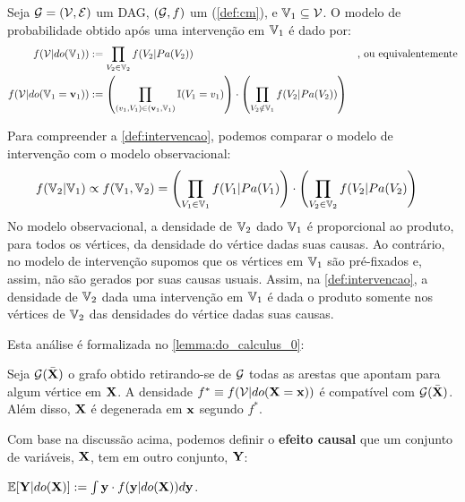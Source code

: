 \begin{definition}
 \label{def:intervencao}
 Seja ${\mathcal G} = ({\mathcal V}, {\mathcal E})$ um DAG,
 $({\mathcal G},f)$ um \CM (\cref{def:cm}), e
 ${\mathbb V}_1 \subseteq {\mathcal V}$. 
 O modelo de probabilidade obtido após
 uma intervenção em ${\mathbb V}_1$ é dado por:
 \begin{align*}
  f({\mathcal V}|do({\mathbb V}_1))
  &:= \prod_{V_2 \in {\mathbb V}_2} f(V_2|Pa(V_2))
  &\text{, ou equivalentemente} \\
  f({\mathcal V}|do({\mathbb V}_1 = {\mathbf{v}}_1))
  &:= \left(\prod_{(v_1,V_1) \in ({\mathbf{v}}_1,{\mathbb V}_1)} {\mathbb I}(V_1 = v_1)\right)
  \cdot \left(\prod_{V_2 \notin {\mathbb V}_1} f(V_2|Pa(V_2))\right)
 \end{align*}
\end{definition}
Para compreender a \cref{def:intervencao}, 
podemos comparar o modelo de intervenção com
o modelo observacional:
\begin{align*}
 f({\mathbb V}_2|{\mathbb V}_1)
 &\propto f({\mathbb V}_1,{\mathbb V}_2)
 = \left(\prod_{V_1 \in {\mathbb V}_1}f(V_1|Pa(V_1)\right) \cdot
   \left(\prod_{V_2 \in {\mathbb V}_2}f(V_2|Pa(V_2)\right)
\end{align*}
No modelo observacional, a densidade de ${\mathbb V}_2$ dado ${\mathbb V}_1$ é
proporcional ao produto, para todos os vértices,
da densidade do vértice dadas suas causas.
Ao contrário, no modelo de intervenção supomos que
os vértices em ${\mathbb V}_1$ são pré-fixados e, assim,
não são gerados por suas causas usuais.
Assim, na \cref{def:intervencao},
a densidade de ${\mathbb V}_2$ dada uma intervenção em ${\mathbb V}_1$ é
dada o produto somente nos vértices de ${\mathbb V}_2$
das densidades do vértice dadas suas causas.

Esta análise é formalizada no \cref{lemma:do_calculus_0}:

\begin{lemma}
 \label{lemma:do_calculus_0}
 Seja ${\mathcal G}(\bar{{\mathbf{X}}})$ o grafo obtido
 retirando-se de ${\mathcal G}$ 
 todas as arestas que apontam para 
 algum vértice em ${\mathbf{X}}$.
 A densidade $f^* \equiv f({\mathcal V}|do({\mathbf{X}}={\mathbf{x}}))$ é 
 compatível com ${\mathcal G}(\bar{{\mathbf{X}}})$. 
 Além disso, ${\mathbf{X}}$ é degenerada em ${\mathbf{x}}$ segundo $f^*$.
\end{lemma}

Com base na discussão acima, podemos definir
o \textbf{efeito causal} que um conjunto de variáveis, ${\mathbf{X}}$,
tem em outro conjunto, ${\mathbf{Y}}$:

\begin{definition}
 \label{def:exp_inter}
 ${\mathbb E}[{\mathbf{Y}}|do({\mathbf{X}})] := \int {\mathbf{y}} \cdot f({\mathbf{y}}|do({\mathbf{X}})) d{\mathbf{y}}$.
\end{definition}

